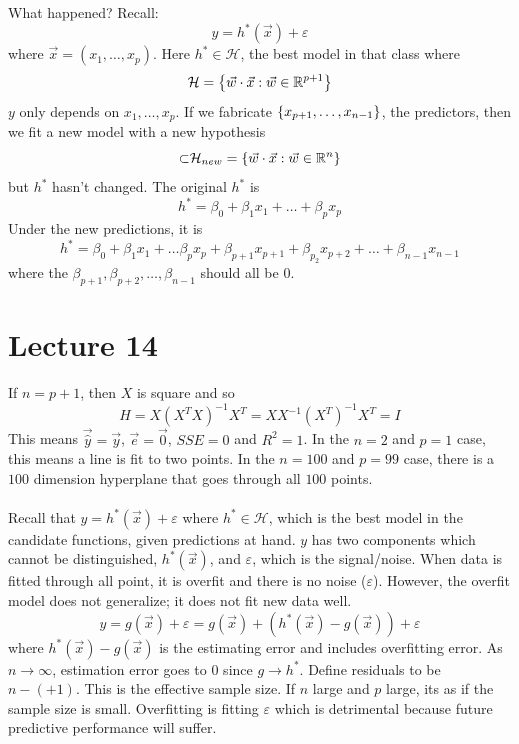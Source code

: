 \documentclass[12pt]{article}
\begin{document}
 What happened? Recall: $$y = h^*(\vec{x}) + \varepsilon$$ where $\vec{x} = (x_1,\dots, x_p)$. Here $h^* \in \mathcal{H}$, the best model in that class where $$\mathcal{H} = \left\{  \vec{w} \cdot \vec{x}: \vec{w} \in \mathbb{R}^{p+1} \right\}$$ $y$ only depends on $x_1,\dots,x_p$. If we fabricate $\left\{ x_{p+1}, \dots, x_{n-1} \right\}$, the predictors, then we fit a new model with a new hypothesis $$ \mathcal \subset \mathcal{H}_{new} = \left\{ \vec{w} \cdot \vec{x}: \vec{w} \in \mathbb{R}^n \right\}$$ 
 but $h^*$ hasn't changed. The original $h^*$ is $$h^* = \beta_0 + \beta_1x_1 + \dots + \beta_px_p$$ 
 Under the new predictions, it is $$h^* = \beta_0 + \beta_1x_1 + \dots \beta_px_p + \beta_{p+1}x_{p+1} + \beta_{p_2}x_{p+2} + \dots + \beta_{n-1}x_{n-1}$$ where the $\beta_{p+1}, \beta_{p+2}, \dots, \beta_{n-1}$ should all be $0$. 

\section{Lecture 14} 
If $n = p+1$, then $X$ is square and so $$H = X(X^TX)^{-1}X^T = XX^{-1}(X^T)^{-1}X^T = I $$ 
This means $\vec{\hat{y}} = \vec{y}$, $\vec{e} = \vec{0}$, $SSE = 0$ and $R^2 = 1$. In the $n=2$ and $p=1$ case, this means a line is fit to two points. In the $n=100$ and $p=99$ case, there is a $100$ dimension hyperplane that goes through all $100$ points. \\~\\
Recall that $y = h^*(\vec{x}) + \varepsilon$ where $h^* \in \mathcal{H}$, which is the best model in the candidate functions, given predictions at hand. $y$ has two components which cannot be distinguished, $h^*(\vec{x})$, and $\varepsilon$, which is the signal/noise. When data is fitted through all point, it is overfit and there is no noise ($\varepsilon$). However, the overfit model does not generalize; it does not fit new data well. 
$$y = g(\vec{x}) + \varepsilon = g(\vec{x}) + (h^*(\vec{x}) - g(\vec{x})) + \varepsilon $$ where $h^*(\vec{x}) - g(\vec{x})$ is the estimating error and includes overfitting error. As $n\to \infty$, estimation error goes to $0$ since $g \to h^*$. Define residuals to be $n-(+1)$. This is the effective sample size. If $n$ large and $p$ large, its as if the sample size is small. Overfitting is fitting $\varepsilon$ which is detrimental because future predictive performance will suffer. 
\end{document}
